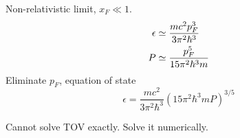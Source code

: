 Non-relativistic limit, $x_F \ll 1$.
\begin{equation}
\begin{split}
	\epsilon &\simeq \frac{m c^2 p_F^3}{3 \pi^2 \hbar^3} \\
	P        &\simeq \frac{p_F^5}{15 \pi^2 \hbar^3 m}
\end{split}
\end{equation}
Eliminate $p_F$, equation of state
\begin{equation}
	\epsilon = \frac{mc^2}{3\pi^2\hbar^3} \left( 15 \pi^2 \hbar^3 m P \right)^{3/5}
\end{equation}

Cannot solve TOV exactly.
Solve it numerically.

